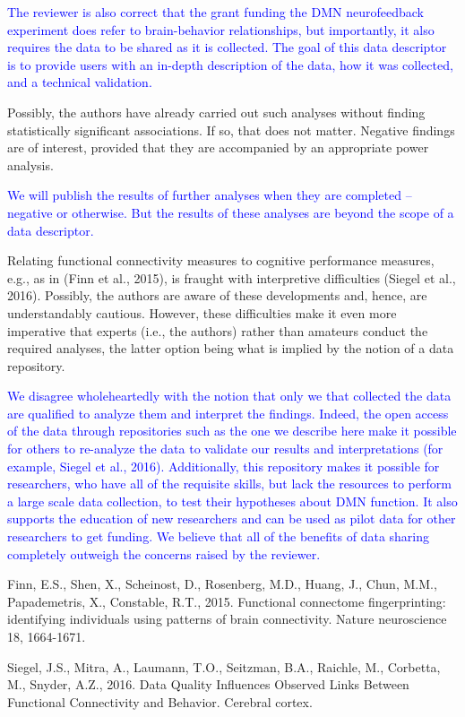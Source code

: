\documentclass{article}
\newcommand{\RESPONSE}[1]{\textcolor{blue}{#1}}
\begin{document}
\RESPONSE{The reviewer is also correct that the grant funding the DMN neurofeedback experiment does refer to brain-behavior relationships, but importantly, it also requires the data to be shared as it is collected. The goal of this data descriptor is to provide users with an in-depth description of the data, how it was collected, and a technical validation. }

Possibly, the authors have already carried out such analyses without finding statistically significant associations. If so, that does not matter. Negative findings are of interest, provided that they are accompanied by an appropriate power analysis. 

\RESPONSE{We will publish the results of further analyses when they are completed -- negative or otherwise. But the results of these analyses are beyond the scope of a data descriptor.}

Relating functional connectivity measures to cognitive performance measures, e.g., as in (Finn et al., 2015), is fraught with interpretive difficulties (Siegel et al., 2016). Possibly, the authors are aware of these developments and, hence, are understandably cautious. However, these difficulties make it even more imperative that experts (i.e., the authors) rather than amateurs conduct the required analyses, the latter option being what is implied by the notion of a data repository.

\RESPONSE{We disagree wholeheartedly with the notion that only we that collected the data are qualified to analyze them and interpret the findings. Indeed, the open access of the data through repositories such as the one we describe here make it possible for others to re-analyze the data to validate our results and interpretations (for example, Siegel et al., 2016). Additionally, this repository makes it possible for researchers, who have all of the requisite skills, but lack the resources to perform a large scale data collection, to test their hypotheses about DMN function. It also supports the education of new researchers and can be used as pilot data for other researchers to get funding. We believe that all of the benefits of data sharing completely outweigh the concerns raised by the reviewer.}

Finn, E.S., Shen, X., Scheinost, D., Rosenberg, M.D., Huang, J., Chun, M.M., Papademetris, X., Constable, R.T., 2015. Functional connectome fingerprinting: identifying individuals using patterns of brain connectivity. Nature neuroscience 18, 1664-1671.

Siegel, J.S., Mitra, A., Laumann, T.O., Seitzman, B.A., Raichle, M., Corbetta, M., Snyder, A.Z., 2016. Data Quality Influences Observed Links Between Functional Connectivity and Behavior. Cerebral cortex.
\end{document}
